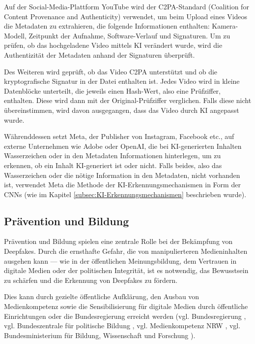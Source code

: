 \documentclass[a4paper,12pt]{article}
\begin{document}
Auf der Social-Media-Plattform YouTube wird der C2PA-Standard (Coalition for Content Provenance and Authenticity) verwendet, um beim Upload eines Videos die Metadaten zu extrahieren, die folgende Informationen enthalten: Kamera-Modell, Zeitpunkt der Aufnahme, Software-Verlauf und Signaturen. Um zu prüfen, ob das hochgeladene Video mittels KI verändert wurde, wird die Authentizität der Metadaten anhand der Signaturen überprüft.  

Des Weiteren wird geprüft, ob das Video C2PA unterstützt und ob die kryptografische Signatur in der Datei enthalten ist. Jedes Video wird in kleine Datenblöcke unterteilt, die jeweils einen Hash-Wert, also eine Prüfziffer, enthalten. Diese wird dann mit der Original-Prüfziffer verglichen. Falls diese nicht übereinstimmen, wird davon ausgegangen, dass das Video durch KI angepasst wurde. \cite{TheVerge2024a}  

Währenddessen setzt Meta, der Publisher von Instagram, Facebook etc., auf externe Unternehmen wie Adobe oder OpenAI, die bei KI-generierten Inhalten Wasserzeichen oder in den Metadaten Informationen hinterlegen, um zu erkennen, ob ein Inhalt KI-generiert ist oder nicht. Falls beides, also das Wasserzeichen oder die nötige Information in den Metadaten, nicht vorhanden ist, verwendet Meta die Methode der KI-Erkennungsmechanismen in Form der CNNs (wie im Kapitel \ref{subsec:KI-Erkennungsmechanismen} beschrieben wurde). \cite{TheVerge2024b} \cite{Meta2024}

\subsection{Prävention und Bildung}
Prävention und Bildung spielen eine zentrale Rolle bei der Bekämpfung von Deepfakes. Durch die ernsthafte Gefahr, die von manipulierteren Medieninhalten ausgehen kann — wie in der öffentlichen Meinungsbildung, dem Vertrauen in digitale Medien oder der politischen Integrität, ist es notwendig, das Bewusstsein zu schärfen und die Erkennung von Deepfakes zu fördern.  

Dies kann durch gezielte öffentliche Aufklärung, den Ausbau von Medienkompetenz sowie die Sensibilisierung für digitale Medien durch öffentliche Einrichtungen oder die Bundesregierung erreicht werden (vgl. Bundesregierung \cite{Bundesregierung2024}, vgl. Bundeszentrale für politische Bildung \cite{BPB2024}, vgl. Medienkompetenz NRW \cite{Medienkompetenz2024}, vgl. Bundesministerium für Bildung, Wissenschaft und Forschung \cite{Erwachsenenbildung2024}).
\end{document}
